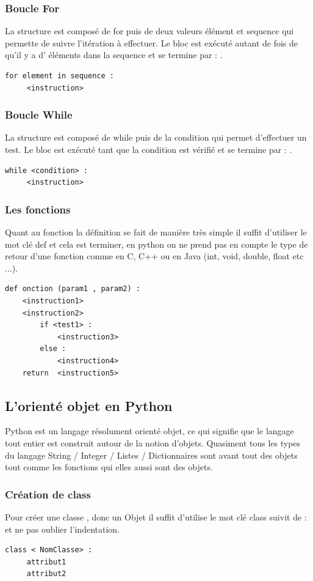 \documentclass[a4paper, 12pt, twoside]{article}
\begin{document}
{{{\subsubsection{ Boucle For}
La structure est composé de for puis de deux valeurs élément et sequence qui permette de suivre l'itération à effectuer. Le bloc est exécuté autant de fois de qu'il y a d' éléments dans la sequence et se termine par  : .
\begin{verbatim}
for element in sequence :
     <instruction>
\end{verbatim}
\subsubsection{ Boucle While }
La structure est composé de while puis de la condition qui permet d'effectuer un test. Le bloc est exécuté tant que la condition est vérifié et se termine par  : .
\begin{verbatim}
while <condition> :
     <instruction>
\end{verbatim}
\subsubsection{ Les fonctions}
Quant au fonction la définition se fait de manière très simple il suffit d'utiliser le mot clé def et cela est terminer, en python on ne prend pas en compte le type de retour d'une fonction comme en C, C++ ou en Java (int, void, double, float etc ...).
\begin{verbatim}
def onction (param1 , param2) :
    <instruction1>
    <instruction2>
        if <test1> :
            <instruction3>
        else :
            <instruction4>
    return  <instruction5>
\end{verbatim}

\subsection{L'orienté objet en Python}
Python est un langage résolument orienté objet, ce qui signifie que le langage tout entier est construit autour de la notion d’objets. Quasiment tous les types du langage String / Integer / Listes / Dictionnaires  sont avant tout des objets tout comme les fonctions qui elles aussi sont des objets.

\subsubsection{Création de class}{Pour créer une classe , donc un Objet il suffit d'utilise le mot clé class suivit de  :  et ne pas oublier l'indentation.}
\begin{verbatim}
class < NomClasse> : 
     attribut1
     attribut2 
\end{verbatim}

}}}
\end{document}
